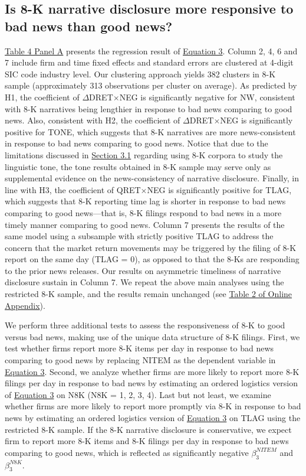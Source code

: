 \documentclass[a4paper]{article}
\begin{document}
\begin{spacing}{2}
\subsection{Is 8-K narrative disclosure more responsive to bad news than good news?}
\hyperref[T4PA]{Table 4 Panel A} presents the regression result of \hyperref[eq3]{Equation 3}. Column 2, 4, 6 and 7 include firm and time fixed effects and standard errors are clustered at 4-digit SIC code industry level. Our clustering approach yields 382 clusters in 8-K sample (approximately 313 observations per cluster on average). As predicted by H1, the coefficient of $\Delta$DRET$\times$NEG is significantly negative for NW, consistent with 8-K narratives being lengthier in response to bad news comparing to good news. Also, consistent with H2, the coefficient of $\Delta$DRET$\times$NEG is significantly positive for TONE, which suggests that 8-K narratives are more news-consistent in response to bad news comparing to good news. Notice that due to the limitations discussed in \hyperref[sec3.1]{Section 3.1} regarding using 8-K corpora to study the linguistic tone, the tone results obtained in 8-K sample may serve only as supplemental evidence on the news-consistency of narrative disclosure. Finally, in line with H3, the coefficient of QRET$\times$NEG is significantly positive for TLAG, which suggests that 8-K reporting time lag is shorter in response to bad news comparing to good news---that is, 8-K filings respond to bad news in a more timely manner comparing to good news. Column 7 presents the results of the same model using a subsample with strictly positive TLAG to address the concern that the market return movements may be triggered by the filing of 8-K report on the same day (TLAG = 0), as opposed to that the 8-Ks are responding to the prior news releases. Our results on asymmetric timeliness of narrative disclosure sustain in Column 7. We repeat the above main analyses using the restricted 8-K sample, and the results remain unchanged (see \hyperref[oat2]{Table 2 of Online Appendix}).

We perform three additional tests to assess the responsiveness of 8-K to good versus bad news, making use of the unique data structure of 8-K filings. First, we test whether firms report more 8-K items per day in response to bad news comparing to good news by replacing NITEM as the dependent variable in \hyperref[eq3]{Equation 3}. Second, we analyze whether firms are more likely to report more 8-K filings per day in response to bad news by estimating an ordered logistics version of \hyperref[eq3]{Equation 3} on N8K (N8K = 1, 2, 3, 4). Last but not least, we examine whether firms are more likely to report more promptly via 8-K in response to bad news by estimating an ordered logistics version of \hyperref[eq3]{Equation 3} on TLAG using the restricted 8-K sample. If the 8-K narrative disclosure is conservative, we expect firm to report more 8-K items and 8-K filings per day in response to bad news comparing to good news, which is reflected as significantly negative $\beta_3^{NITEM}$ and $\beta_3^{N8K}$.


\end{spacing}
\end{document}
